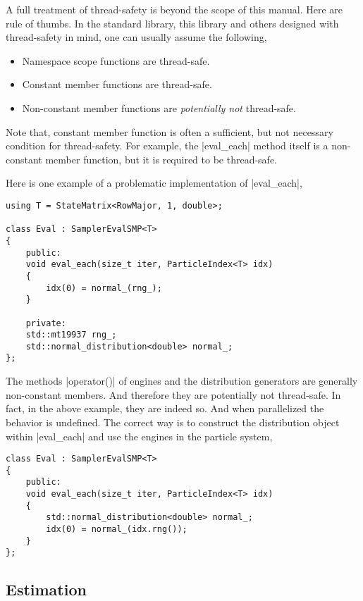 A full treatment of thread-safety is beyond the scope of this manual. Here are
rule of thumbs. In the standard library, this library and others designed with
thread-safety in mind, one can usually assume the following,
\begin{itemize}
  \item Namespace scope functions are thread-safe.
  \item Constant member functions are thread-safe.
  \item Non-constant member functions are \emph{potentially not} thread-safe.
\end{itemize}
Note that, constant member function is often a sufficient, but not necessary
condition for thread-safety. For example, the |eval_each| method itself is a
non-constant member function, but it is required to be thread-safe.

Here is one example of a problematic implementation of |eval_each|,
\begin{verbatim}
using T = StateMatrix<RowMajor, 1, double>;

class Eval : SamplerEvalSMP<T>
{
    public:
    void eval_each(size_t iter, ParticleIndex<T> idx)
    {
        idx(0) = normal_(rng_);
    }

    private:
    std::mt19937 rng_;
    std::normal_distribution<double> normal_;
};
\end{verbatim}
The methods |operator()| of \rng engines and the distribution generators are
generally non-constant members. And therefore they are potentially not
thread-safe. In fact, in the above example, they are indeed so. And when
parallelized the behavior is undefined. The correct way is to construct the
distribution object within |eval_each| and use the \rng engines in the particle
system,
\begin{verbatim}
class Eval : SamplerEvalSMP<T>
{
    public:
    void eval_each(size_t iter, ParticleIndex<T> idx)
    {
        std::normal_distribution<double> normal_;
        idx(0) = normal_(idx.rng());
    }
};
\end{verbatim}

\subsection{Estimation}
\label{sub:Estimation}

